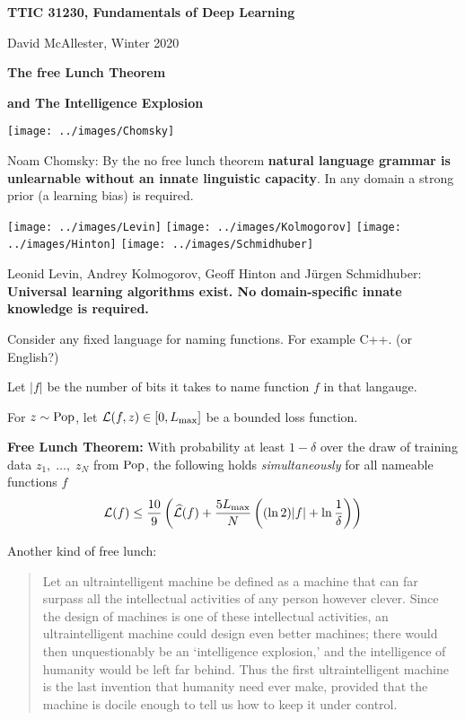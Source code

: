 




{\Huge

  \centerline{\bf TTIC 31230, Fundamentals of Deep Learning}
  \bigskip
  \centerline{David McAllester, Winter 2020}

\vfill
  \centerline{\bf The free Lunch Theorem}
  \vfill
  \centerline{\bf and The Intelligence Explosion}
  \vfill
  \vfill


\texttt{[image: ../images/Chomsky]} \begin{minipage}[b]{8in} Noam Chomsky: 
  By the no free lunch theorem {\bf natural language grammar is unlearnable without an innate linguistic capacity}. In any domain a strong prior (a learning bias)
  is required. \end{minipage}

\vfill
\texttt{[image: ../images/Levin]}
\texttt{[image: ../images/Kolmogorov]}
\texttt{[image: ../images/Hinton]}
\texttt{[image: ../images/Schmidhuber]}

\begin{minipage}[b]{7in}
  Leonid Levin, Andrey Kolmogorov, Geoff Hinton and J\"{u}rgen Schmidhuber: {\bf Universal learning algorithms exist.
  No domain-specific innate knowledge is required.}
\end{minipage}


Consider any fixed language for naming functions. For example C++. (or English?)

\vfill
Let $|f|$ be the number of bits it takes to name function $f$ in that langauge.

\vfill
For $z \sim \mathrm{Pop}$, let ${\cal L}(f,z) \in [0,L_{\mathrm{max}}]$ be a bounded loss function.

\vfill
{\bf Free Lunch Theorem:} With probability at least $1-\delta$ over the draw of training data $z_1,\;\ldots,\;z_N$ from $\mathrm{Pop}$,
the following holds {\em simultaneously} for all nameable functions $f$
$${\cal L}(f) \leq\frac{10}{9}\left(\widehat{\cal L}(f) + \frac{5L_{\mathrm{max}}}{N}\left((\ln 2)|f| + \ln\frac{1}{\delta}\right)\right)$$


Another kind of free lunch:

\vfill
\begin{quotation}
Let an ultraintelligent machine be defined as a machine that can far surpass all the intellectual activities of any person however clever. Since the design of machines is one of these intellectual activities, an ultraintelligent machine could design even better machines; there would then unquestionably be an ‘intelligence explosion,’ and the intelligence of humanity would be left far behind. Thus the first ultraintelligent machine is the last invention that humanity need ever make, provided that the machine is docile enough to tell us how to keep it under control.
\end{quotation}

}
